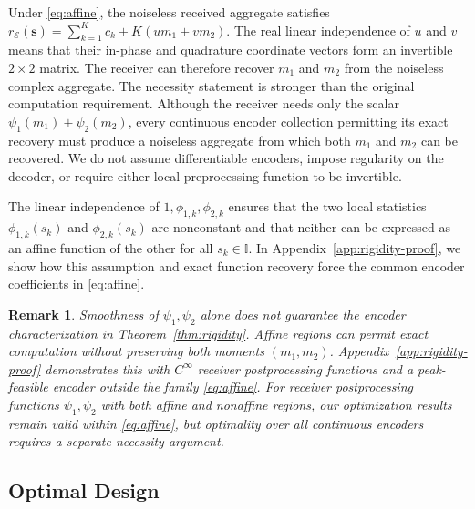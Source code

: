 \documentclass[journal,12pt,onecolumn,draftclsnofoot]{IEEEtran}
\newtheorem{remark}{Remark}
\newcommand{\enc}{\mathscr{E}}\newcommand{\dec}{\mathscr{D}}\newcommand{\R}{\mathbb R}\newcommand{\C}{\mathbb C}
\begin{document}
Under \eqref{eq:affine}, the noiseless received aggregate satisfies
$r_\enc(\boldsymbol s)
=\sum_{k=1}^K c_k+K(um_1+vm_2).$
The real linear independence of $u$ and $v$ means that their in-phase and quadrature coordinate vectors form an invertible $2\times2$ matrix. The receiver can therefore recover $m_1$ and $m_2$ from the noiseless complex aggregate. The necessity statement is stronger than the original computation requirement.  Although the receiver needs only the scalar $\psi_1(m_1)+\psi_2(m_2)$, every continuous encoder collection permitting its exact recovery must produce a noiseless aggregate from which both $m_1$ and $m_2$ can be recovered. We do not assume differentiable encoders, impose regularity on the decoder, or require either local preprocessing function to be invertible.

The linear independence of $1,\phi_{1,k},\phi_{2,k}$ ensures that the two local statistics $\phi_{1,k}(s_k)$ and $\phi_{2,k}(s_k)$ are nonconstant and that neither can be expressed as an affine function of the other for all $s_k\in\mathbb I$. In Appendix~\ref{app:rigidity-proof}, we show how this assumption and exact function recovery force the common encoder coefficients in \eqref{eq:affine}.


\begin{remark}\label{rem:rigidity-smoothness}
Smoothness of $\psi_1,\psi_2$ alone does not guarantee the encoder
characterization in Theorem~\ref{thm:rigidity}. Affine regions can
permit exact computation without preserving both moments $(m_1,m_2)$.
Appendix~\ref{app:rigidity-proof} demonstrates this with
$C^\infty$ receiver postprocessing functions and a peak-feasible encoder outside
the family \eqref{eq:affine}. For receiver postprocessing functions $\psi_1,\psi_2$ with both
affine and nonaffine regions, our optimization results remain valid
within \eqref{eq:affine}, but optimality over all continuous
encoders requires a separate necessity argument.
\end{remark}


\subsection{Optimal Design}\label{sec:synthesis}
\end{document}
